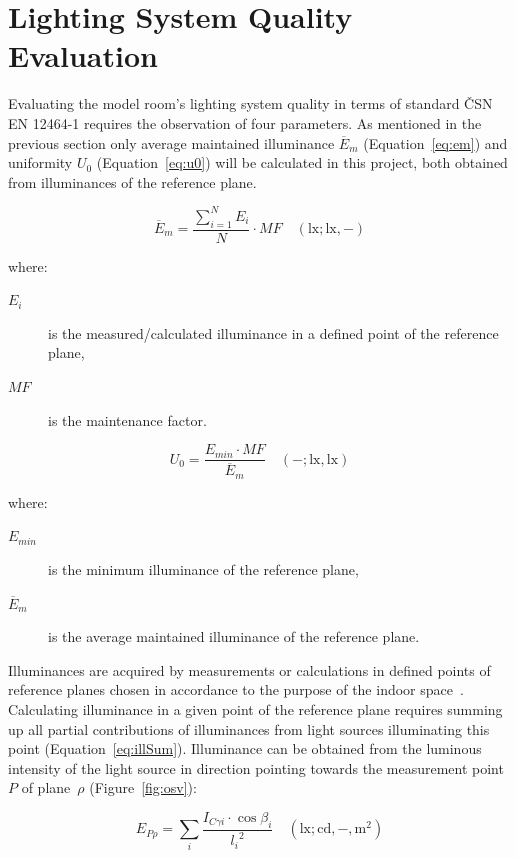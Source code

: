 \section{Lighting System Quality Evaluation}
Evaluating the model room's lighting system quality in terms of standard \v{C}SN EN 12464-1\cite{12464} requires the observation of four parameters. As mentioned in the previous section only average maintained illuminance $\overline{E}_{m}$ (Equation~\ref{eq:em}) and uniformity $U_{0}$ (Equation~\ref{eq:u0}) will be calculated in this project, both obtained from illuminances of the reference plane.

\begin{equation}
\overline{E}_{m}=\frac{\sum_{i=1}^N E_{i}}{N} \cdot MF \quad \mathrm{(lx;lx,-)}
\label{eq:em}
\end{equation}

\noindent where:
\begin{description}
	\item[$E_{i}$] is the measured/calculated illuminance in a defined point of the reference plane,
	\item[$MF$] is the maintenance factor.
\end{description}

\begin{equation}
U_{0}=\frac{E_{min}\cdot MF}{\overline{E}_{m}} \quad \mathrm{(-;lx,lx)}
\label{eq:u0}
\end{equation}

\noindent where:
\begin{description}
	\item[$E_{min}$] is the minimum illuminance of the reference plane,
	\item[$\overline{E}_{m}$] is the average maintained illuminance of the reference plane.
\end{description}

Illuminances are acquired by measurements or calculations in defined points of reference planes chosen in accordance to the purpose of the indoor space~\cite{12464}. Calculating illuminance in a given point of the reference plane requires summing up all partial contributions of illuminances from light sources illuminating this point (Equation~\ref{eq:illSum}). Illuminance can be obtained from the luminous intensity of the light source in direction pointing towards the measurement point~$P$ of plane~$\rho$ (Figure~\ref{fig:osv}):

\begin{equation}
E_{P\rho}=\sum_{i} \frac{I_{C \gamma i} \cdot \cos{\beta_{i}}}{{l_{i}}^{2}} \quad \mathrm{(lx;cd,-,m^{2})}
\label{eq:illSum}
\end{equation}

